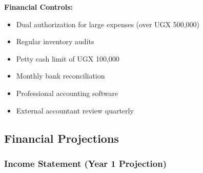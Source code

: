 \documentclass[a4paper,12pt]{article}
\begin{document}
\textbf{Financial Controls:}
\begin{itemize}[leftmargin=2em]
    \item Dual authorization for large expenses (over UGX 500,000)
    \item Regular inventory audits
    \item Petty cash limit of UGX 100,000
    \item Monthly bank reconciliation
    \item Professional accounting software
    \item External accountant review quarterly
\end{itemize}

\subsection{Financial Projections}

\subsubsection{Income Statement (Year 1 Projection)}
\end{document}
